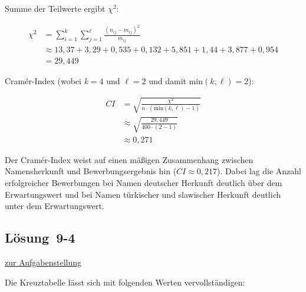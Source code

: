 \documentclass[
  11pt,
  ngerman,
  a4paper,
]{report}
\begin{document}
Summe der Teilwerte ergibt \(\chi^2\):

\[
\begin{aligned}
\chi^2&= \sum_{i=1}^{k}\sum_{j=1}^{\ell}\frac{(n_{ij}-m_{ij})^{2}}{m_{ij}}\\[4pt]
      &\approx13{,}37+3{,}29+0{,}535+0{,}132+5{,}851+1{,}44+3{,}877+0{,}954\\
      &=29{,}449
\end{aligned}
\]

Cramér-Index (wobei \(k=4\) und \(\ell=2\) und damit \(\mathrm{min}(k,\ell)=2\)):

\[
\begin{aligned}
\mathit{CI}&=\sqrt{\frac{\chi^2}{n\cdot (\mathrm{min}(k, \ell)-1)}}\\[6pt]
&\approx\sqrt{\frac{29{,}449}{400\cdot(2-1)}}\\[4pt]
&\approx0{,}271
\end{aligned}
\]

Der Cramér-Index weist auf einen mäßigen Zusammenhang zwischen Namensherkunft und Bewerbungsergebnis hin (\(\mathit{CI}\approx0{,}217\)). Dabei lag die Anzahl erfolgreicher Bewerbungen bei Namen deutscher Herkunft deutlich über dem Erwartungswert und bei Namen türkischer und slawischer Herkunft deutlich unter dem Erwartungswert.

\hypertarget{loesung-9-4}{%
\subsection{Lösung~9-4}\label{loesung-9-4}}

\protect\hyperlink{aufgabe-9-4}{zur Aufgabenstellung}

Die Kreuztabelle lässt sich mit folgenden Werten vervollständigen:
\end{document}
